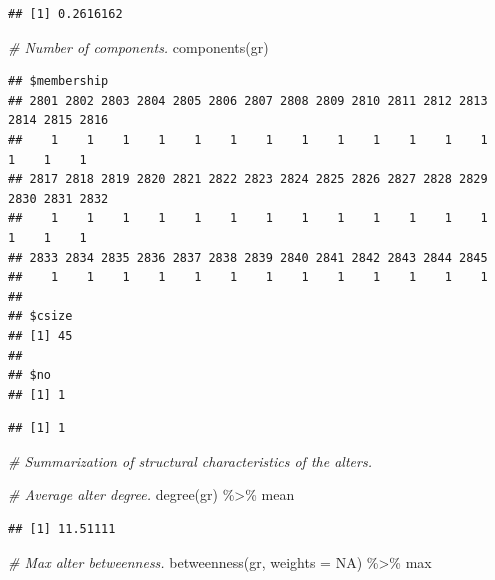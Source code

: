 \documentclass[
]{book}
\newenvironment{Shaded}{\begin{snugshade}}{\end{snugshade}}
\newcommand{\AttributeTok}[1]{\textcolor[rgb]{0.77,0.63,0.00}{#1}}
\newcommand{\CommentTok}[1]{\textcolor[rgb]{0.56,0.35,0.01}{\textit{#1}}}
\newcommand{\ConstantTok}[1]{\textcolor[rgb]{0.00,0.00,0.00}{#1}}
\newcommand{\FunctionTok}[1]{\textcolor[rgb]{0.00,0.00,0.00}{#1}}
\newcommand{\NormalTok}[1]{#1}
\newcommand{\SpecialCharTok}[1]{\textcolor[rgb]{0.00,0.00,0.00}{#1}}
\begin{document}
\begin{verbatim}
## [1] 0.2616162
\end{verbatim}

\begin{Shaded}
\begin{Highlighting}[]
\CommentTok{\# Number of components.}
\FunctionTok{components}\NormalTok{(gr)}
\end{Highlighting}
\end{Shaded}

\begin{verbatim}
## $membership
## 2801 2802 2803 2804 2805 2806 2807 2808 2809 2810 2811 2812 2813 2814 2815 2816 
##    1    1    1    1    1    1    1    1    1    1    1    1    1    1    1    1 
## 2817 2818 2819 2820 2821 2822 2823 2824 2825 2826 2827 2828 2829 2830 2831 2832 
##    1    1    1    1    1    1    1    1    1    1    1    1    1    1    1    1 
## 2833 2834 2835 2836 2837 2838 2839 2840 2841 2842 2843 2844 2845 
##    1    1    1    1    1    1    1    1    1    1    1    1    1 
## 
## $csize
## [1] 45
## 
## $no
## [1] 1
\end{verbatim}

\begin{Shaded}
\end{Shaded}

\begin{verbatim}
## [1] 1
\end{verbatim}

\begin{Shaded}
\begin{Highlighting}[]
\CommentTok{\# Summarization of structural characteristics of the alters.}

\CommentTok{\# Average alter degree.}
\FunctionTok{degree}\NormalTok{(gr) }\SpecialCharTok{\%\textgreater{}\%}\NormalTok{ mean}
\end{Highlighting}
\end{Shaded}

\begin{verbatim}
## [1] 11.51111
\end{verbatim}

\begin{Shaded}
\begin{Highlighting}[]
\CommentTok{\# Max alter betweenness.}
\FunctionTok{betweenness}\NormalTok{(gr, }\AttributeTok{weights =} \ConstantTok{NA}\NormalTok{) }\SpecialCharTok{\%\textgreater{}\%}\NormalTok{ max}
\end{Highlighting}
\end{Shaded}
\end{document}
